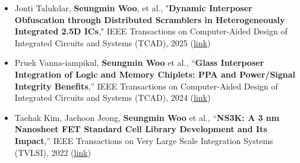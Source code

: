 \documentclass[10pt,letter,ragged2e]{altacv}
\begin{document}
\begin{itemize}
    \item Jonti Talukdar, \textbf{Seungmin Woo}, et al., "\textbf{Dynamic Interposer Obfuscation through Distributed Scramblers in Heterogeneously Integrated 2.5D ICs}," IEEE Transactions on Computer-Aided Design of Integrated Circuits and Systems (TCAD), 2025 (\href{https://doi.org/10.1109/TCAD.2025.3580649}{link})
    \item Pruek Vanna-iampikul, \textbf{Seungmin Woo} et al., “\textbf{Glass Interposer Integration of Logic and Memory Chiplets: PPA and Power/Signal Integrity Benefits},” IEEE Transactions on Computer-Aided Design of Integrated Circuits and Systems (TCAD), 2024 (\href{https://doi.org/10.1109/TCAD.2024.3504361}{link})
    \item Taehak Kim, Jaehoon Jeong, \textbf{Seungmin Woo} et al., “\textbf{NS3K: A 3 nm Nanosheet FET Standard Cell Library Development and Its Impact},” IEEE Transactions on Very Large Scale Integration Systems (TVLSI), 2022 (\href{https://doi.org/10.1109/TVLSI.2022.3229442}{link})
\end{itemize}









\end{document}
